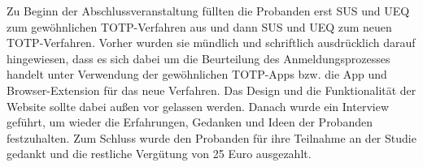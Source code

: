 Zu Beginn der Abschlussveranstaltung füllten die Probanden erst SUS und UEQ zum 
gewöhnlichen TOTP-Verfahren aus und dann SUS und UEQ zum neuen TOTP-Verfahren. 
Vorher wurden sie mündlich und schriftlich ausdrücklich darauf hingewiesen, 
dass es sich dabei um die Beurteilung des Anmeldungsprozesses handelt unter 
Verwendung der gewöhnlichen TOTP-Apps bzw. die App und Browser-Extension für 
das neue Verfahren. Das Design und die Funktionalität der Website sollte dabei 
außen vor gelassen werden. Danach wurde ein Interview geführt, um wieder die 
Erfahrungen, Gedanken und Ideen der Probanden festzuhalten. Zum 
Schluss wurde den Probanden für ihre Teilnahme an der Studie gedankt und die 
restliche Vergütung von 25 Euro ausgezahlt.